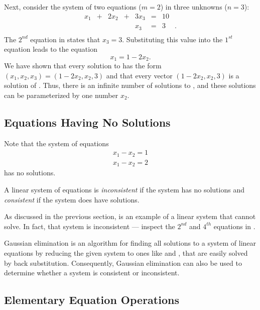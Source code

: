 \documentclass{ximera}
\begin{document}
Next, consider the system of two equations ($m=2$) in three
unknowns ($n=3$):
\begin{equation}  \label{e23}
\begin{array}{rcrcrcrl}
  x_1 & + & 2x_2 & + & 3x_3 & = &  10  & \\
      &   &      &   &  x_3 & = &   3  & \! . \\
\end{array}
\end{equation}
The $2^{nd}$ equation in  states that $x_3=3$.
Substituting
this value into the $1^{st}$ equation leads to the equation
\[
x_1 = 1-2x_2.
\]
We have shown that every solution to  has the form
$(x_1,x_2,x_3)=(1-2x_2,x_2,3)$ and that every vector
$(1-2x_2,x_2,3)$ is a solution of .  Thus, there is an
infinite number of solutions to , and these solutions
can be parameterized by one number $x_2$.

\subsection*{Equations Having No Solutions}

Note that the system of equations
\begin{eqnarray*}
x_1 - x_2 = 1\\
x_1 - x_2 = 2
\end{eqnarray*}
has no solutions.

\begin{definition}
A linear system of equations is {\em inconsistent\/} if the
system has no solutions and {\em consistent\/} if the system
does have solutions.
\end{definition}  

As discussed in the previous section,  is an example
of a linear system that \Matlab cannot solve.  In fact, that
system is inconsistent --- inspect the $2^{nd}$ and $4^{th}$
equations in .

Gaussian elimination is an algorithm for finding all solutions
to a system of linear equations by reducing the given system to
ones like  and , that are easily solved by
back substitution.  Consequently, Gaussian elimination can also be
used to determine whether a system is consistent or inconsistent.

\subsection*{Elementary Equation Operations}
\end{document}
